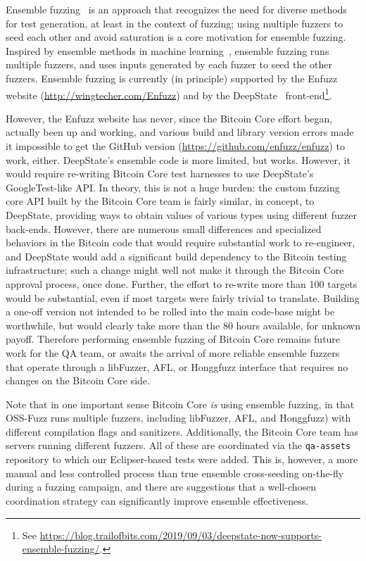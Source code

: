 Ensemble fuzzing~\cite{chen2019enfuzz} is an approach that recognizes the need for
diverse methods for test generation, at least in the context of
fuzzing; using multiple fuzzers to seed each other and avoid saturation is a core motivation for ensemble fuzzing.   Inspired by ensemble methods in machine learning~\cite{dietterich2002ensemble},
ensemble fuzzing runs multiple fuzzers, and uses inputs generated by
each fuzzer to seed the other fuzzers.  Ensemble fuzzing is currently (in principle)
supported by the Enfuzz website  (\url{http://wingtecher.com/Enfuzz})
and by the DeepState~\cite{goodman2018deepstate} front-end\footnote{See
  \url{https://blog.trailofbits.com/2019/09/03/deepstate-now-supports-ensemble-fuzzing/}.}.

However, the Enfuzz website has never, since the Bitcoin Core effort began, actually been up and working, and various build and library version errors made it impossible to get the GitHub version (\url{https://github.com/enfuzz/enfuzz}) to work, either.  DeepState's ensemble code is more limited, but works.  However, it would require re-writing Bitcoin Core test harnesses to use DeepState's GoogleTest-like API.  In theory, this is not a huge burden: the custom fuzzing core API built by the Bitcoin Core team is fairly similar, in concept, to DeepState, providing ways to obtain values of various types using different fuzzer back-ends.  However, there are numerous small differences and specialized behaviors in the Bitcoin code that would require substantial work to re-engineer, and DeepState would add a significant build dependency to the Bitcoin testing infrastructure; such a change might well not make it through the Bitcoin Core approval process, once done.   Further, the effort to re-write more than 100 targets would be substantial, even if most targets were fairly trivial to translate. Building a one-off version not intended to be rolled into the main code-base might be worthwhile, but would clearly take more than the 80 hours available, for unknown payoff.   Therefore performing ensemble fuzzing of Bitcoin Core remains future work for the QA team, or awaits the arrival of more reliable ensemble fuzzers that operate through a libFuzzer, AFL, or Honggfuzz interface that requires no changes on the Bitcoin Core side.

Note that in one important sense Bitcoin Core \emph{is} using ensemble fuzzing, in that OSS-Fuzz runs multiple fuzzers, including libFuzzer, AFL, and Honggfuzz) with different compilation flags and sanitizers.  Additionally, the Bitcoin Core team has servers running different fuzzers.  All of these are coordinated via the {\tt qa-assets} repository to which our Eclipser-based tests were added.  This is, however, a more manual and less controlled process than true ensemble cross-seeding on-the-fly during a fuzzing campaign, and there are suggestions that a well-chosen coordination strategy can significantly improve ensemble effectiveness.
